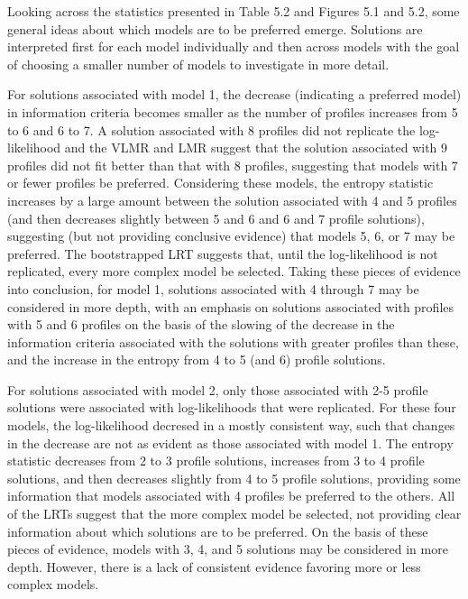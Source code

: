 \documentclass[]{msu-thesis}
\theoremstyle{definition}
\theoremstyle{definition}
\theoremstyle{definition}
\theoremstyle{remark}
\begin{document}
Looking across the statistics presented in Table 5.2 and Figures 5.1 and
5.2, some general ideas about which models are to be preferred emerge.
Solutions are interpreted first for each model individually and then
across models with the goal of choosing a smaller number of models to
investigate in more detail.

For solutions associated with model 1, the decrease (indicating a
preferred model) in information criteria becomes smaller as the number
of profiles increases from 5 to 6 and 6 to 7. A solution associated with
8 profiles did not replicate the log-likelihood and the VLMR and LMR
suggest that the solution associated with 9 profiles did not fit better
than that with 8 profiles, suggesting that models with 7 or fewer
profiles be preferred. Considering these models, the entropy statistic
increases by a large amount between the solution associated with 4 and 5
profiles (and then decreases slightly between 5 and 6 and 6 and 7
profile solutions), suggesting (but not providing conclusive evidence)
that models 5, 6, or 7 may be preferred. The bootstrapped LRT suggests
that, until the log-likelihood is not replicated, every more complex
model be selected. Taking these pieces of evidence into conclusion, for
model 1, solutions associated with 4 through 7 may be considered in more
depth, with an emphasis on solutions associated with profiles with 5 and
6 profiles on the basis of the slowing of the decrease in the
information criteria associated with the solutions with greater profiles
than these, and the increase in the entropy from 4 to 5 (and 6) profile
solutions.

For solutions associated with model 2, only those associated with 2-5
profile solutions were associated with log-likelihoods that were
replicated. For these four models, the log-likelihood decresed in a
mostly consistent way, such that changes in the decrease are not as
evident as those associated with model 1. The entropy statistic
decreases from 2 to 3 profile solutions, increases from 3 to 4 profile
solutions, and then decreases slightly from 4 to 5 profile solutions,
providing some information that models associated with 4 profiles be
preferred to the others. All of the LRTs suggest that the more complex
model be selected, not providing clear information about which solutions
are to be preferred. On the basis of these pieces of evidence, models
with 3, 4, and 5 solutions may be considered in more depth. However,
there is a lack of consistent evidence favoring more or less complex
models.
\end{document}
